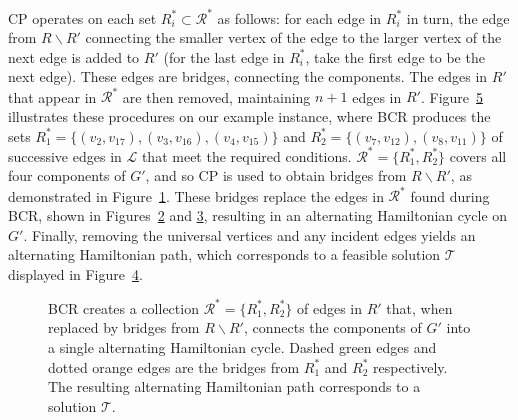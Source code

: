 \documentclass[authoryear]{elsarticle}
\begin{document}
CP operates on each set $R^*_i \subset \mathcal{R}^*$ as follows: for each edge in $R^*_i$ in turn, the edge from $R \backslash R'$ connecting the smaller vertex of the edge to the larger vertex of the next edge is added to $R'$ (for the last edge in $R^*_i$, take the first edge to be the next edge). These edges are bridges, connecting the components. The edges in $R'$ that appear in $\mathcal{R}^*$ are then removed, maintaining $n+1$ edges in $R'$. Figure~\ref{fig:bcr} illustrates these procedures on our example instance, where BCR produces the sets $R^*_1 = \{(v_2, v_{17}),(v_3, v_{16}), (v_4, v_{15})\}$  and $R^*_2 = \{(v_7, v_{12}), (v_8, v_{11})\}$ of successive edges in $\mathcal{L}$ that meet the required conditions. $\mathcal{R}^* =\{R^*_1, R^*_2\}$ covers all four components of $G'$, and so CP is used to obtain bridges from $R\backslash R'$, as demonstrated in Figure~\ref{fig:bcrandcp}. These bridges replace the edges in $\mathcal{R}^*$ found during BCR, shown in Figures~\ref{fig:mpsconnect} and \ref{fig:mpscycle}, resulting in an alternating Hamiltonian cycle on $G'$. Finally, removing the universal vertices and any incident edges yields an alternating Hamiltonian path, which corresponds to a feasible solution $\mathcal{T}$ displayed in Figure~\ref{fig:solutionpath}.

\begin{figure}[H]	
	\centering
	\begin{subfigure}[h]{0.35\textwidth}
		
		\caption{}
		\label{fig:bcrandcp}
	\end{subfigure} \hspace{7mm} %
	\begin{subfigure}[h]{0.25\textwidth}
		
		\caption{}
		\label{fig:mpsconnect}
	\end{subfigure} \hspace{7mm} %
	\begin{subfigure}[h]{0.25\textwidth}
		
		\caption{}
		\label{fig:mpscycle}
	\end{subfigure}
	\begin{subfigure}[h]{0.75\textwidth}
		
		\caption{}
		\label{fig:solutionpath}
	\end{subfigure}
	\caption{BCR creates a collection $\mathcal{R}^* = \{R^*_1, R^*_2\}$ of edges in $R'$ that, when replaced by bridges from $R\backslash R'$, connects the components of $G'$ into a single alternating Hamiltonian cycle. Dashed green edges and dotted orange edges are the bridges from $R^*_1$ and $R^*_2$ respectively. The resulting alternating Hamiltonian path corresponds to a solution $\mathcal{T}$.}
	\label{fig:bcr}
\end{figure}
\end{document}
